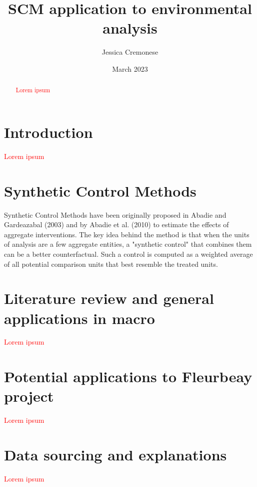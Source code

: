 \documentclass[12pt,a4paper,draft]{article}
\begin{document}
\begin{titlepage}
\title{SCM application to environmental analysis}
\author{Jessica Cremonese}
\date{March 2023}
\maketitle
\end{titlepage}

\tableofcontents

\newpage
\begin{abstract}
    \textcolor{red}{Lorem ipsum}
\end{abstract}
\newpage


\section{Introduction}
\textcolor{red}{Lorem ipsum}




\section{Synthetic Control Methods}
Synthetic Control Methods have been originally proposed in Abadie and Gardeazabal (2003) and by Abadie et al. (2010) to estimate the effects of aggregate interventions.
The key idea behind the method is that when the units of analysis are a few aggregate entities, a "synthetic control" that combines them can be a better counterfactual.
Such a control is computed as a weighted average of all potential comparison units that best resemble the treated units.


\section{Literature review and general applications in macro}
\textcolor{red}{Lorem ipsum}




\section{Potential applications to Fleurbeay project}
\textcolor{red}{Lorem ipsum}




\section{Data sourcing and explanations}
\textcolor{red}{Lorem ipsum}
\end{document}
